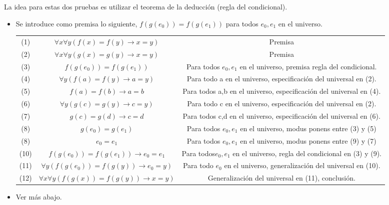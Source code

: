 \begin{enumerate}
\begin{solucion}
    La idea para estas dos pruebas es utilizar el teorema de la deducción (regla del condicional).
    \begin{itemize}
        \item Se introduce como premisa lo siguiente, $f(g(e_{0})) = f(g(e_{1}))$ para todos $e_{0},e_{1}$ en el universo. \newline
        \begin{tabular}{c c c}
             (1) & $\forall x \forall y (f(x) = f(y) \rightarrow x = y)$ & Premisa \\
             (2) & $\forall x \forall y (g(x) = g(y) \rightarrow x = y)$ & Premisa \\
             (3) & $f(g(e_{0})) = f(g(e_{1}))$ & Para todos $e_{0},e_{1}$ en el universo, premisa regla del condicional. \\
             (4) & $\forall y (f(a) = f(y) \rightarrow a = y)$ & Para todo a en el universo, especificación del universal en (2). \\
             (5) & $ f(a) = f(b) \rightarrow a = b$ & Para todos a,b en el universo, especificación del universal en (4). \\
             (6) & $ \forall y (g(c) = g(y) \rightarrow c = y)$ & Para todo c en el universo, especificación del universal en (2). \\
             (7) & $ g(c) = g(d) \rightarrow c = d$ & Para todos c,d en el universo, especificación del universal en (6). \\
             (8) & $g(e_{0}) = g(e_{1})$ &  Para todos $e_{0},e_{1}$ en el universo, modus ponens entre (3) y (5) \\
             (8) & $e_{0} = e_{1}$ &  Para todos $e_{0},e_{1}$ en el universo, modus ponens entre (9) y (7) \\
             (10) & $f(g(e_{0})) = f(g(e_{1})) \rightarrow e_{0} = e_{1}$ & Para todos$e_{0},e_{1}$ en el universo, regla del condicional en (3)  y (9).  \\
             (11) & $ \forall y ( f(g(e_{0})) = f(g(y)) \rightarrow e_{0} = y)$ & Para todo $e_{0}$ en el universo, generalización del universal en (10). \\
             (12) & $ \forall x \forall y ( f(g(x)) = f(g(y)) \rightarrow x = y)$ & Generalización del universal en (11), conclusión.
        \end{tabular}

        \item Ver más abajo.
    \end{itemize}

    \end{solucion}
\end{enumerate}



